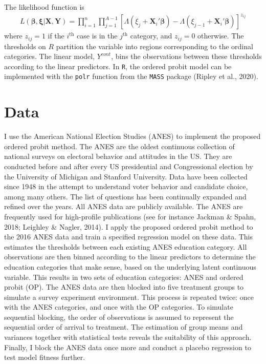 \documentclass[12pt,econ]{sources/authesis}
\begin{document}
The likelihood function is
\begin{align}
L(\bm{\beta},\bm{\xi}|\bm{X},\bm{Y}) = \prod_{i=1}^{n}\prod_{j=1}^{A-1}\left[\Lambda(\xi_j + \bm{X}_i'\bm{\beta}) - \Lambda(\xi_{j-1} + \bm{X}_i'\bm{\beta}) \right]^{z_{ij}}
\end{align}
where \(z_{ij}=1\) if the \(i^\text{th}\) case is in the \(j^\text{th}\) category, and \(z_{ij}=0\) otherwise. The thresholds on \(R\) partition the variable into regions corresponding to the ordinal categories. The linear model, \(Y^{cont}\), bins the observations between these thresholds according to the linear predictors. In \texttt{R}, the ordered probit model can be implemented with the \texttt{polr} function from the \texttt{MASS} package (Ripley et al., 2020).

\hypertarget{ordblock-data}{%
\section{Data}\label{ordblock-data}}

I use the American National Election Studies (ANES) to implement the proposed ordered probit method. The ANES are the oldest continuous collection of national surveys on electoral behavior and attitudes in the US. They are conducted before and after every US presidential and Congressional election by the University of Michigan and Stanford University. Data have been collected since 1948 in the attempt to understand voter behavior and candidate choice, among many others. The list of questions has been continually expanded and refined over the years. All ANES data are publicly available. The ANES are frequently used for high-profile publications (see for instance Jackman \& Spahn, 2018; Leighley \& Nagler, 2014). I apply the proposed ordered probit method to the 2016 ANES data and train a specified regression model on these data. This estimates the thresholds between each existing ANES education category. All observations are then binned according to the linear predictors to determine the education categories that make sense, based on the underlying latent continuous variable. This results in two sets of education categories: ANES and ordered probit (OP). The ANES data are then blocked into five treatment groups to simulate a survey experiment environment. This process is repeated twice: once with the ANES categories, and once with the OP categories. To simulate sequential blocking, the order of observations is assumed to represent the sequential order of arrival to treatment. The estimation of group means and variances together with statistical tests reveals the suitability of this approach. Finally, I block the ANES data once more and conduct a placebo regression to test model fitness further.
\end{document}
